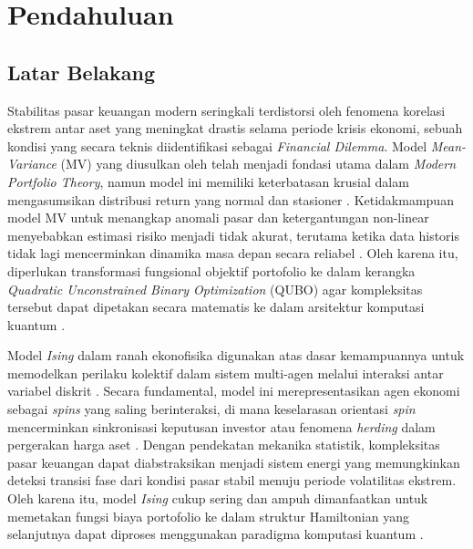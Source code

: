 \chapter{Pendahuluan}

\section{Latar Belakang}
Stabilitas pasar keuangan modern seringkali terdistorsi oleh fenomena korelasi ekstrem antar aset yang meningkat drastis selama periode krisis ekonomi, sebuah kondisi yang secara teknis diidentifikasi sebagai \textit{Financial Dilemma}. Model \textit{Mean-Variance} (MV) yang diusulkan oleh \cite{markowitz_portfolio_1952} telah menjadi fondasi utama dalam \textit{Modern Portfolio Theory}, namun model ini memiliki keterbatasan krusial dalam mengasumsikan distribusi return yang normal dan stasioner \cite{abdul_hali_markowitz_2020}. Ketidakmampuan model MV untuk menangkap anomali pasar dan ketergantungan non-linear menyebabkan estimasi risiko menjadi tidak akurat, terutama ketika data historis tidak lagi mencerminkan dinamika masa depan secara reliabel \cite{sikalo_efficient_2022}. Oleh karena itu, diperlukan transformasi fungsional objektif portofolio ke dalam kerangka \textit{Quadratic Unconstrained Binary Optimization} (QUBO) agar kompleksitas tersebut dapat dipetakan secara matematis ke dalam arsitektur komputasi kuantum \cite{wang_achieving_2025}.

Model \textit{Ising} dalam ranah ekonofisika digunakan atas dasar kemampuannya untuk memodelkan perilaku kolektif dalam sistem multi-agen melalui interaksi antar variabel diskrit \cite{mantegna_introduction_2000}. Secara fundamental, model ini merepresentasikan agen ekonomi sebagai \textit{spins} yang saling berinteraksi, di mana keselarasan orientasi \textit{spin} mencerminkan sinkronisasi keputusan investor atau fenomena \textit{herding} dalam pergerakan harga aset \cite{hidalgo_quantum_2006}. Dengan pendekatan mekanika statistik, kompleksitas pasar keuangan dapat diabstraksikan menjadi sistem energi yang memungkinkan deteksi transisi fase dari kondisi pasar stabil menuju periode volatilitas ekstrem. Oleh karena itu, model \textit{Ising} cukup sering dan ampuh dimanfaatkan untuk memetakan fungsi biaya portofolio ke dalam struktur Hamiltonian yang selanjutnya dapat diproses menggunakan paradigma komputasi kuantum \cite{lucas_ising_2014}.

